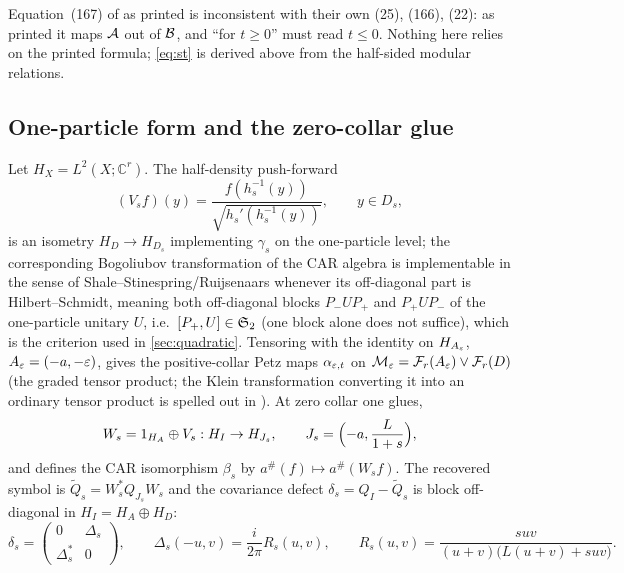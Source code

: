 \begin{remark}
Equation~(167) of \cite{FHSW} as printed is inconsistent with their own (25),
(166), (22): as printed it maps $\mathcal A$ out of $\mathcal B$, and ``for $t\ge0$'' must read
$t\le0$.  Nothing here relies on the printed formula; \eqref{eq:st} is derived
above from the half-sided modular relations.
\end{remark}

\subsection{One-particle form and the zero-collar glue}
Let $H_X=L^2(X;\mathbb C^r)$.  The half-density push-forward
\begin{equation}\label{eq:Vs}
 (V_sf)(y)=\frac{f(h_s^{-1}(y))}{\sqrt{h_s'(h_s^{-1}(y))}},\qquad y\in D_s,
\end{equation}
is an isometry $H_D\to H_{D_s}$ implementing $\gamma_s$ on the one-particle level;
the corresponding Bogoliubov transformation of the CAR algebra is implementable in
the sense of Shale--Stinespring/Ruijsenaars \cite{Ruij77} whenever its
off-diagonal part is Hilbert--Schmidt, meaning both off-diagonal blocks $P_-UP_+$ and $P_+UP_-$ of the one-particle unitary $U$, i.e.\ $[P_+,U]\in\mathfrak S_2$ (one block alone does not suffice), which is the criterion used in
\cref{sec:quadratic}.
Tensoring with the identity on $H_{A_\varepsilon}$, $A_\varepsilon=(-a,-\varepsilon)$, gives the
positive-collar Petz maps $\alpha_{\varepsilon,t}$ on
$\mathcal M_\varepsilon=\mathcal F_r(A_\varepsilon)\vee\mathcal F_r(D)$ (the graded tensor product; the Klein
transformation converting it into an ordinary tensor product is spelled out in
\cite{Note4}).  At zero collar one glues,
\begin{equation}\label{eq:Ws}
 W_s=1_{H_A}\oplus V_s:H_I\to H_{J_s},\qquad J_s=\Bigl(-a,\frac L{1+s}\Bigr),
\end{equation}
and defines the CAR isomorphism $\beta_s$ by $a^\#(f)\mapsto a^\#(W_sf)$.  The
recovered symbol is $\widetilde Q_s=W_s^*Q_{J_s}W_s$ and the covariance defect
$\delta_s=Q_I-\widetilde Q_s$ is block off-diagonal in $H_I=H_A\oplus H_D$:
\begin{equation}\label{eq:defect}
 \delta_s=\begin{pmatrix}0&\Delta_s\\ \Delta_s^*&0\end{pmatrix},\qquad
 \Delta_s(-u,v)=\frac i{2\pi}R_s(u,v),\qquad
 R_s(u,v)=\frac{suv}{(u+v)\bigl(L(u+v)+suv\bigr)} .
\end{equation}

